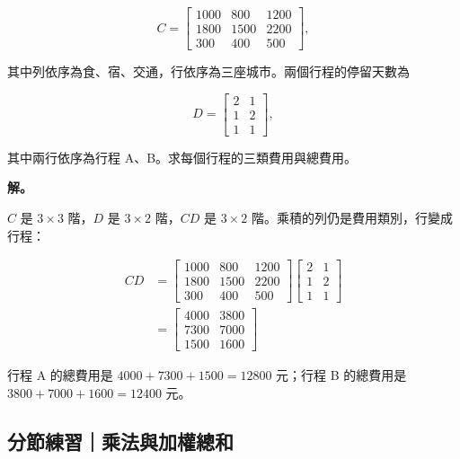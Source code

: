 \documentclass[11pt,a4paper]{article}
\begin{document}
\[
C=
\begin{bmatrix}
1000&800&1200\\
1800&1500&2200\\
300&400&500
\end{bmatrix},
\]

其中列依序為食、宿、交通，行依序為三座城市。兩個行程的停留天數為

\[
D=
\begin{bmatrix}
2&1\\
1&2\\
1&1
\end{bmatrix},
\]

其中兩行依序為行程 A、B。求每個行程的三類費用與總費用。

\textbf{解。}

\(C\) 是 \(3\times3\) 階，\(D\) 是 \(3\times2\) 階，\(CD\) 是 \(3\times2\) 階。乘積的列仍是費用類別，行變成行程：

\[
\begin{aligned}
CD
&=
\begin{bmatrix}
1000&800&1200\\
1800&1500&2200\\
300&400&500
\end{bmatrix}
\begin{bmatrix}2&1\\1&2\\1&1\end{bmatrix}\\
&=
\begin{bmatrix}
4000&3800\\
7300&7000\\
1500&1600
\end{bmatrix}
\end{aligned}
\]

行程 A 的總費用是 \(4000+7300+1500=12800\) 元；行程 B 的總費用是 \(3800+7000+1600=12400\) 元。

\subsection{分節練習｜乘法與加權總和}\label{ux5206ux7bc0ux7df4ux7fd2ux4e58ux6cd5ux8207ux52a0ux6b0aux7e3dux548c}
\end{document}
